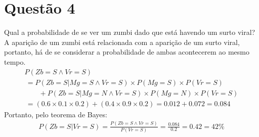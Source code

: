 \documentclass{article}
\begin{document}
    \section*{Questão 4}
        Qual a probabilidade de se ver um zumbi dado que está havendo
        um surto viral? \\
        A aparição de um zumbi está relacionada com a aparição de um surto viral,
        portanto, há de se considerar a probabilidade de ambas acontecerem ao mesmo
        tempo.
        \begin{gather*}
            P(Zb=S \land Vr=S) \\
            \,= P(Zb=S|Mg=S \land Vr=S) \times P(Mg=S) \times P(Vr=S) \\
            \qquad+ P(Zb=S|Mg=N \land Vr=S) \times P(Mg=N) \times P(Vr=S) \\
            \,= (0.6 \times 0.1 \times 0.2) + (0.4 \times 0.9 \times 0.2)
            = 0.012 + 0.072 = 0.084
        \end{gather*}
        Portanto, pelo teorema de Bayes:
        \begin{gather*}
            P(Zb=S|Vr=S) = \frac{P(Zb=S \land Vr=S)}{P(Vr=S)} = \frac{0.084}{0.2}
            = 0.42 = 42\%
        \end{gather*}
\end{document}
